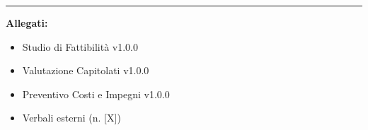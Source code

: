\documentclass[11pt, a4paper]{article}
\begin{document}
	\vspace{1.5cm}
	
	\rule{\textwidth}{0.4pt}
	\vspace{0.1cm}
	\textbf{Allegati:}
	\begin{itemize}
		\item Studio di Fattibilità v1.0.0
		\item Valutazione Capitolati v1.0.0
		\item Preventivo Costi e Impegni v1.0.0
		\item Verbali esterni (n. {[X]})
	\end{itemize}
	
\end{document}
